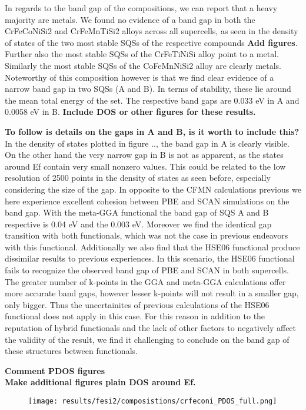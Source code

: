 In regards to the band gap of the compositions, we can report that a heavy majority are metals. We found no evidence of a band gap in both the CrFeCoNiSi2 and CrFeMnTiSi2 alloys across all supercells, as seen in the density of states of the two most stable SQSs of the respective compounds \textbf{Add figures}. Further also the most stable SQSs of the CrFeTiNiSi alloy point to a metal. Similarly the most stable SQSs of the CoFeMnNiSi2 alloy are clearly metals. Noteworthy of this composition however is that we find clear evidence of a narrow band gap in two SQSs (A and B). In terms of stability, these lie around the mean total energy of the set. The respective band gaps are 0.033 eV in A and 0.0058 eV in B. \textbf{Include DOS or other figures for these results.} 

\textbf{To follow is details on the gaps in A and B, is it worth to include this?}
In the density of states plotted in figure .., the band gap in A is clearly visible. On the other hand the very narrow gap in B is not as apparent, as the states around Ef contain very small nonzero values.  This could be related to the low resolution of 2500 points in the density of states as seen before, especially considering the size of the gap. In opposite to the CFMN calculations previous we here experience excellent cohesion between PBE and SCAN simulations on the band gap. With the meta-GGA functional the band gap of SQS A and B respective is 0.04 eV and the 0.003 eV. Moreover we find the identical gap transition with both functionals, which was not the case in previous endeavors with this functional. Additionally we also find that the HSE06 functional produce dissimilar results to previous experiences. In this scenario, the HSE06 functional fails to recognize the observed band gap of PBE and SCAN in both supercells. The greater number of k-points in the GGA and meta-GGA calculations offer more accurate band gaps, however lesser k-points will not result in a smaller gap, only bigger. Thus the uncertainites of previous calculations of the HSE06 functional does not apply in this case. For this reason in addition to the reputation of hybrid functionals and the lack of other factors to negatively affect the validity of the result, we find it challenging to conclude on the band gap of these structures between functionals.

\textbf{Comment PDOS figures} \\
\textbf{Make additional figures plain DOS around Ef. \\}
\begin{figure}[H]
	\centering
	\texttt{[image: results/fesi2/composistions/crfeconi\_PDOS\_full.png]}
	\caption{}
\end{figure}


